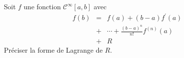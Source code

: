 Soit $f$ une fonction $\mathcal{C}^\infty[a,b]$ avec \begin{eqnarray*}
f(b)&=&f(a)+(b-a)f^\prime (a)\\&+&\cdots + \frac{(b-a)^n}{n!}f^{(n)}(a)\\
&+& R
\end{eqnarray*}
Pr\'eciser la forme de Lagrange de $R$.\bigskip \bigskip